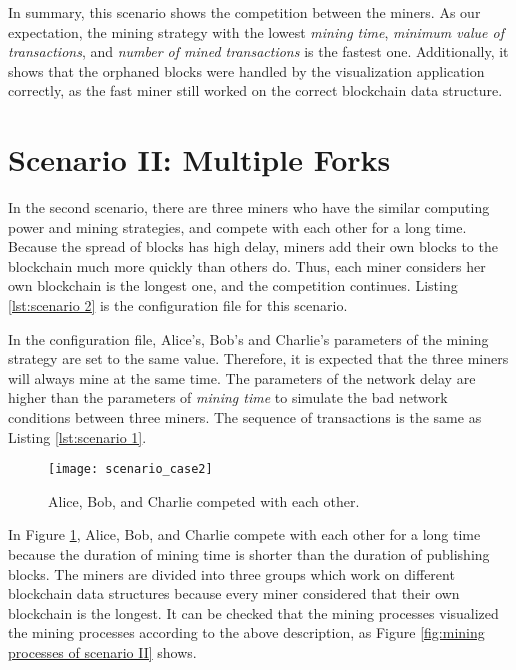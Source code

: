 In summary, this scenario shows the competition between the miners. As our expectation, the mining strategy with the lowest \textit{mining time}, \textit{minimum value of transactions}, and \textit{number of mined transactions} is the fastest one. Additionally, it shows that the orphaned blocks were handled by the visualization application correctly, as the fast miner still worked on the correct blockchain data structure.

\section{Scenario II: Multiple Forks}

In the second scenario, there are three miners who have the similar computing power and mining strategies, and compete with each other for a long time. Because the spread of blocks has high delay, miners add their own blocks to the blockchain much more quickly than others do. Thus, each miner considers her own blockchain is the longest one, and the competition continues. Listing \ref{lst:scenario 2} is the configuration file for this scenario.

In the configuration file, Alice's, Bob's and Charlie's parameters of the mining strategy are set to the same value. Therefore, it is expected that the three miners will always mine at the same time. The parameters of the network delay are higher than the parameters of \textit{mining time} to simulate the bad network conditions between three miners. The sequence of transactions is the same as Listing \ref{lst:scenario 1}.

\begin{figure}[htb]
    \centering
    \texttt{[image: scenario\_case2]}
    \caption{Alice, Bob, and Charlie competed with each other.}
    \label{fig:alice, bob, and charlie competed with each other}
\end{figure}

In Figure \ref{fig:alice, bob, and charlie competed with each other}, Alice, Bob, and Charlie compete with each other for a long time because the duration of mining time is shorter than the duration of publishing blocks. The miners are divided into three groups which work on different blockchain data structures because every miner considered that their own blockchain is the longest. It can be checked that the mining processes visualized the mining processes according to the above description, as Figure \ref{fig:mining processes of scenario II} shows.

